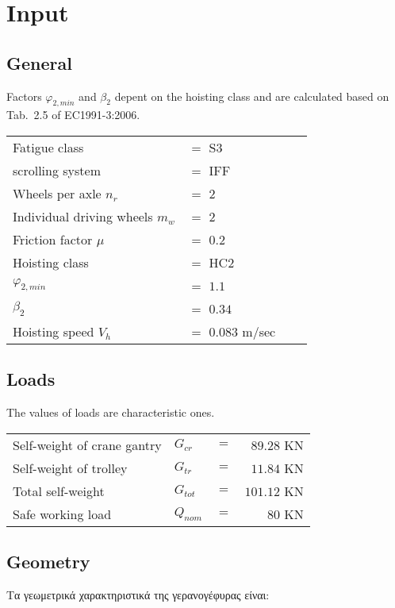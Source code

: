 \documentclass[a4paper,10pt, final, oneside, fleqn, onecolumn]{article}	%
\begin{document}
\section{Input}
\subsection{General}

Factors $φ_{2,min}$ and $β_2$ depent on the hoisting class and
are calculated based on Tab.~2.5 of EC1991-3:2006.

\begin{tabular}{llcr}
    Fatigue class                       &$=$ S3 \\
    scrolling system                    &$=$ IFF\\
    Wheels per axle    $n_r$            &$=$ $2 $ \\
    Individual driving wheels $m_w$     &$=$ $2$ \\
    Friction factor $\mu$               &$=$ $0.2$ \\
    Hoisting class                      &$=$ HC2 \\
    $φ_{2,min}$                         &$=$ $1.1$ \\
    $β_2$                               &$=$ $0.34$ \\
    Hoisting speed  $V_h$               &$=$ $0.083$ m/sec
\end{tabular}

\subsection{Loads}
The values ​​of loads are characteristic ones.

\begin{tabular}{llcr}
    Self-weight of crane gantry     & $G_{cr}$  &$=$ &$89.28$ KN \\
    Self-weight of trolley          & $G_{tr}$  &$=$ &$11.84$ KN \\
    Total self-weight               & $G_{tot}$ &$=$ &$101.12$ KN \\
    Safe working load               & $Q_{nom}$ &$=$ &$80$ KN
\end{tabular}

\subsection{Geometry}
Τα γεωμετρικά χαρακτηριστικά της γερανογέφυρας είναι:
\end{document}
